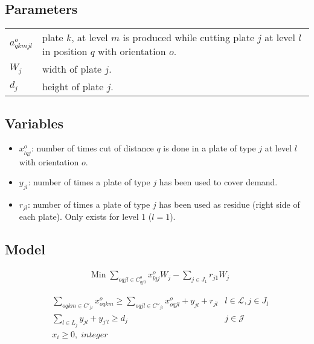 \documentclass[a4paper,11pt]{article}
\begin{document}
    \vskip 0.3cm

    \subsection{Parameters}

    \begin{tabular}{ll}
        $a^o_{qkmjl}$ & plate $k$, at level $m$ is produced while cutting plate $j$ at level $l$ in position $q$ with orientation $o$. \\
        $W_j$ & width of plate $j$.\\
        $d_j$ & height of plate $j$.\\
    \end{tabular}

    \subsection{Variables}

    \begin{itemize}
         \item $x^o_{lqj}$: number of times cut of distance $q$ is done in a plate of type $j$ at level $l$ with orientation $o$.
         \item $y_{jl}$: number of times a plate of type $j$ has been used to cover demand.
         \item $r_{jl}$: number of times a plate of type $j$ has been used as residue (right side of each plate). Only exists for level 1 ($l=1$).
    \end{itemize}

    \subsection{Model}

    \begin{align}
        & \text{Min}\; \sum_{oqjl \in C^o_{qj0}} x^o_{lqj} W_j - \sum_{j \in J_1} r_{j1} W_j
    \end{align}

    \begin{align}
        & \sum_{oqkm \in C'_{jl}} x^o_{oqkm} \geq \sum_{oqjl \in C''_{jl}} x^o_{oqjl} + y_{jl} + r_{jl}
            & l \in \mathcal{L}, j \in J_l \\
        & \sum_{l \in L_{j}} y_{jl} + y_{j'l} \geq d_j & j \in \mathcal{J} \\
        & x_{i} \geq 0,\; integer \\
    \end{align}
\end{document}
